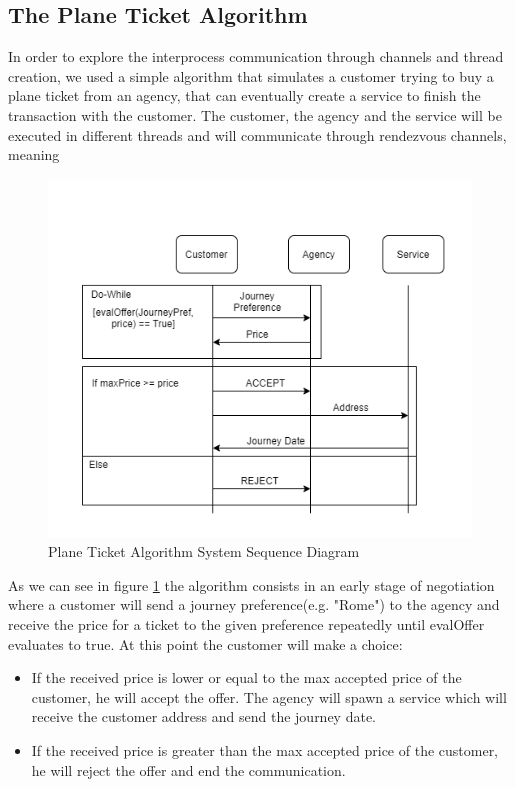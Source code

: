 \documentclass[runningheads]{llncs}
\begin{document}
\subsection{The Plane Ticket Algorithm}
In order to explore the interprocess communication through channels and thread creation, we used a simple algorithm that simulates a customer trying to buy a plane ticket from an agency, that can eventually create a service to finish the transaction with the customer. The customer, the agency and the service will be executed in different threads and will communicate through rendezvous channels, meaning 
\begin{figure}[H]
\centering
\includegraphics[scale=0.4]{Algorithm.png}
\caption{Plane Ticket Algorithm System Sequence Diagram}
\label{ssd}
\end{figure}
As we can see in figure \ref{ssd} the algorithm consists in an early stage of negotiation where a customer will send a journey preference(e.g. "Rome") to the agency and receive the price for a ticket to the given preference repeatedly until evalOffer evaluates to true.
At this point the customer will make a choice:
\begin{itemize}
\item If the received price is lower or equal to the max accepted price of the customer, he will accept the offer.
The agency will spawn a service which will receive the customer address and send the journey date.
\item If the received price is greater than the max accepted price of the customer, he will reject the offer and end the communication.
\end{itemize}
\end{document}
